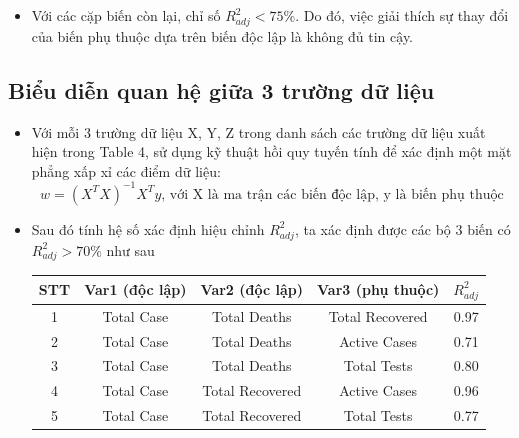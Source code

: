 \documentclass[a4paper, 12pt]{article}
\begin{document}
\begin{itemize}
\begin{itemize}
            \item Với các cặp biến còn lại, chỉ số $R_{adj}^2 < 75\%$. Do đó, việc giải thích sự thay đổi của biến phụ thuộc dựa trên biến độc lập là không đủ tin cậy.
        \end{itemize}
    \end{itemize}

    \subsection{Biểu diễn quan hệ giữa 3 trường dữ liệu}

    \begin{itemize}
        \item Với mỗi 3 trường dữ liệu X, Y, Z trong danh sách các trường dữ liệu xuất hiện trong Table 4, sử dụng kỹ thuật hồi quy tuyến tính để xác định một mặt phẳng xấp xỉ các điểm dữ liệu:
        \begin{equation}
            w = (X^T X)^{-1}X^Ty \text{, với X là ma trận các biến độc lập, y là biến phụ thuộc}
        \end{equation}
        \item Sau đó tính hệ số xác định hiệu chỉnh $R_{adj}^2$, ta xác định được các bộ 3 biến có $R_{adj}^2 > 70\%$ như sau
        \begin{table}[H]
            \centering
            \begin{tabular}{|c|c|c|c|c|} 
            \hline
            \textbf{ STT } & \textbf{ Var1 (độc lập) } & \textbf{ Var2 (độc lập) } & \textbf{ Var3 (phụ thuộc) } & \textbf{$R_{adj}^2$}  \\ \hline
            1              & Total Case                & Total Deaths              & Total Recovered             & 0.97                \\ \hline
            2              & Total Case                & Total Deaths              & Active Cases                & 0.71                \\ \hline
            3              & Total Case                & Total Deaths              & Total Tests                 & 0.80                \\ \hline
            4              & Total Case                & Total Recovered           & Active Cases                & 0.96                \\ \hline
            5              & Total Case                & Total Recovered           & Total Tests                 & 0.77                \\ \hline

\end{tabular}
\end{table}
\end{itemize}
\end{document}
